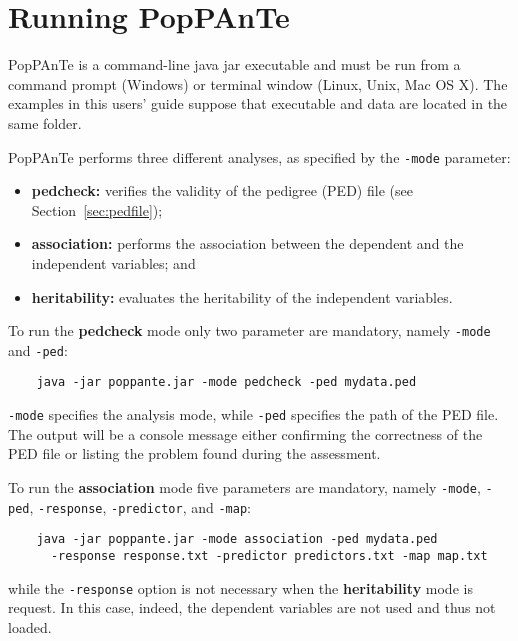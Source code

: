 \documentclass[a4paper,9pt]{article}
\newcommand{\minusitem}{\item[-]}
\begin{document}
\section{Running PopPAnTe}
\label{sec:usage}

PopPAnTe is a command-line java jar executable and must be run from a command prompt (Windows) or terminal window (Linux, Unix, Mac OS X). The examples in this users' guide suppose that executable and data are located in the same folder.


\vspace{0.5cm}

\noindent
PopPAnTe performs three different analyses, as specified by the \texttt{-mode} parameter:

\begin{itemize}
	\setlength{\itemsep}{-3pt}
	\minusitem \textbf{pedcheck:} verifies the validity of the pedigree (PED) file (see Section~\ref{sec:pedfile});
	\minusitem \textbf{association:} performs the association between the dependent and the independent variables; and
	\minusitem \textbf{heritability:} evaluates the heritability of the independent variables.\
\end{itemize}

\vspace{0.5cm}

\noindent
To run the \textbf{pedcheck} mode only two parameter are mandatory, namely \texttt{-mode} and \texttt{-ped}:

\begin{Verbatim}
	java -jar poppante.jar -mode pedcheck -ped mydata.ped
\end{Verbatim}

\noindent
\texttt{-mode} specifies the analysis mode, while \texttt{-ped} specifies the path of the PED file.
The output will be a console message either confirming the correctness of the PED file or listing the problem found during the assessment.

\vspace{0.5cm}

\noindent
To run the \textbf{association} mode five parameters are mandatory, namely \texttt{-mode}, \texttt{-ped}, \texttt{-response}, \texttt{-predictor}, and \texttt{-map}:
\begin{Verbatim}
	java -jar poppante.jar -mode association -ped mydata.ped 
	  -response response.txt -predictor predictors.txt -map map.txt
\end{Verbatim}

\noindent
while the \texttt{-response} option is not necessary when the \textbf{heritability} mode is request. In this case, indeed, the dependent variables are not used and thus not loaded.
 
\end{document}
